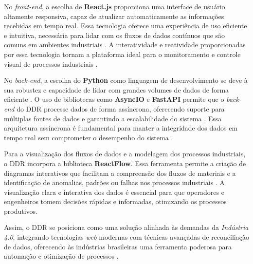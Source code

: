 No \textit{front-end}, a escolha de \textbf{React.js} proporciona uma interface de usuário altamente responsiva, capaz de atualizar automaticamente as informações recebidas em tempo real. Essa tecnologia oferece uma experiência de uso eficiente e intuitiva, necessária para lidar com os fluxos de dados contínuos que são comuns em ambientes industriais \cite{reactjs}. A interatividade e reatividade proporcionadas por essa tecnologia tornam a plataforma ideal para o monitoramento e controle visual de processos industriais \cite{eloquentjavascript}.

No \textit{back-end}, a escolha do \textbf{Python} como linguagem de desenvolvimento se deve à sua robustez e capacidade de lidar com grandes volumes de dados de forma eficiente \cite{databasesql}. O uso de bibliotecas como \textbf{AsyncIO} e \textbf{FastAPI} permite que o \textit{back-end} do DDR processe dados de forma assíncrona, oferecendo suporte para múltiplas fontes de dados e garantindo a escalabilidade do sistema \cite{backenddevroles}. Essa arquitetura assíncrona é fundamental para manter a integridade dos dados em tempo real sem comprometer o desempenho do sistema \cite{industrydigital}.

Para a visualização dos fluxos de dados e a modelagem dos processos industriais, o DDR incorpora a biblioteca \textbf{ReactFlow}. Essa ferramenta permite a criação de diagramas interativos que facilitam a compreensão dos fluxos de materiais e a identificação de anomalias, padrões ou falhas nos processos industriais \cite{graph}. A visualização clara e interativa dos dados é essencial para que operadores e engenheiros tomem decisões rápidas e informadas, otimizando os processos produtivos.

Assim, o DDR se posiciona como uma solução alinhada às demandas da \textit{Indústria 4.0}, integrando tecnologias \textit{web} modernas com técnicas avançadas de reconciliação de dados, oferecendo às indústrias brasileiras uma ferramenta poderosa para automação e otimização de processos \cite{industry4status}.
